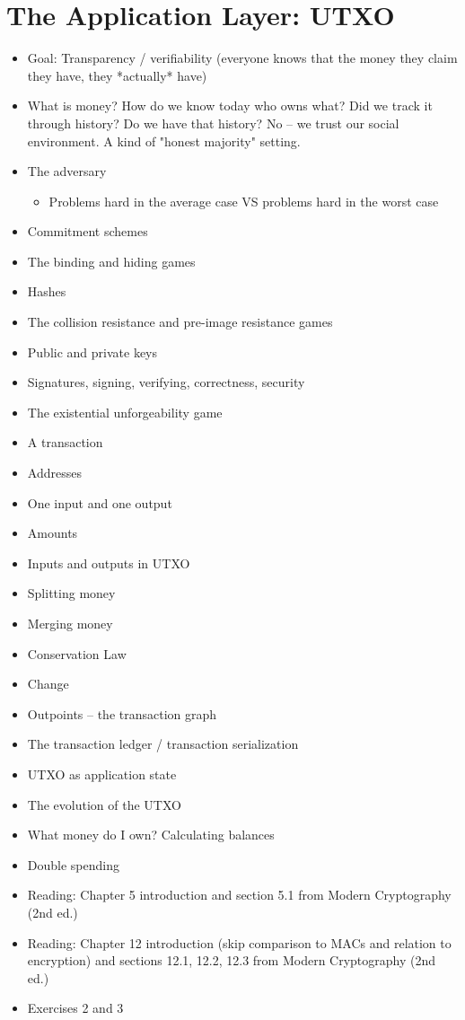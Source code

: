 \chapter{The Application Layer: UTXO}

{\color{red}
\begin{itemize}
\item 
  Goal: Transparency / verifiability (everyone knows that the money they claim they have, they *actually* have)
\item
  What is money? How do we know today who owns what? Did we track it through history? Do we have that history? No -- we trust our social environment. A kind of "honest majority" setting.
\item The adversary
  \begin{itemize}
    \item Problems hard in the average case VS problems hard in the worst case
  \end{itemize}
\item Commitment schemes
\item The binding and hiding games
\item Hashes
\item The collision resistance and pre-image resistance games
\item Public and private keys
\item Signatures, signing, verifying, correctness, security
\item The existential unforgeability game
\item A transaction
\item Addresses
\item One input and one output
\item Amounts
\item Inputs and outputs in UTXO
\item Splitting money
\item Merging money
\item Conservation Law
\item Change
\item Outpoints -- the transaction graph
\item The transaction ledger / transaction serialization
\item UTXO as application state
\item The evolution of the UTXO
\item What money do I own? Calculating balances
\item Double spending
\item Reading: Chapter 5 introduction and section 5.1 from Modern Cryptography (2nd ed.)
\item Reading: Chapter 12 introduction (skip comparison to MACs and relation to encryption) and sections 12.1, 12.2, 12.3 from Modern Cryptography (2nd ed.)
\item Exercises 2 and 3
\end{itemize}
}
